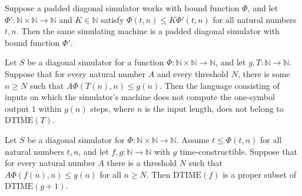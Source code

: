 \begin{definition}
\label{Complexity.TimeHierarchy.DiagSimulator.mono}
\leanok
{}
Suppose a padded diagonal simulator works with bound function $\Phi$, and let $\Phi' :
\mathbb{N} \times \mathbb{N} \to \mathbb{N}$ and $K \in \mathbb{N}$ satisfy $\Phi(t,n)
\le K\Phi'(t,n)$ for all natural numbers $t,n$. Then the same simulating machine is a
padded diagonal simulator with bound function $\Phi'$.
\end{definition}

\begin{theorem}
\label{Complexity.TimeHierarchy.DiagSimulator.diagLang_not_mem_DTIME}
\leanok
{}
Let $S$ be a diagonal simulator for a function
$\Phi:\mathbb{N}\times\mathbb{N}\to\mathbb{N}$, and let $g,T:\mathbb{N}\to\mathbb{N}$.
Suppose that for every natural number $A$ and every threshold $N$, there is some $n\ge
N$ such that $A\Phi(T(n),n)\le g(n)$. Then the language consisting of inputs on which
the simulator's machine does not compute the one-symbol output $1$ within $g(n)$ steps,
where $n$ is the input length, does not belong to $\mathrm{DTIME}(T)$.
\end{theorem}

\begin{theorem}
\label{Complexity.TimeHierarchy.DiagSimulator.time_hierarchy}
\leanok
{}
Let $S$ be a diagonal simulator for $\Phi:\mathbb{N}\times\mathbb{N}\to\mathbb{N}$.
Assume $t\le\Phi(t,n)$ for all natural numbers $t,n$, and let
$f,g:\mathbb{N}\to\mathbb{N}$ with $g$ time-constructible. Suppose that for every
natural number $A$ there is a threshold $N$ such that $A\Phi(f(n),n)\le g(n)$ for all
$n\ge N$. Then $\mathrm{DTIME}(f)$ is a proper subset of $\mathrm{DTIME}(g+1)$.
\end{theorem}

